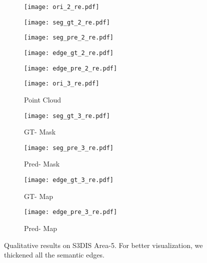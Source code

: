 \documentclass[runningheads]{llncs}
\begin{document}
\begin{figure}
\begin{subfigure}{.193\textwidth}
  \centering
  \texttt{[image: ori\_2\_re.pdf]}
\end{subfigure} \hfil
\begin{subfigure}{.193\textwidth}
  \centering
  \texttt{[image: seg\_gt\_2\_re.pdf]}
\end{subfigure} \hfil
\begin{subfigure}{.193\textwidth}
  \centering
  \texttt{[image: seg\_pre\_2\_re.pdf]}
\end{subfigure} \hfil
\begin{subfigure}{.193\textwidth}
  \centering
  \texttt{[image: edge\_gt\_2\_re.pdf]}
\end{subfigure} \hfil
\begin{subfigure}{.193\textwidth}
  \centering
  \texttt{[image: edge\_pre\_2\_re.pdf]}
\end{subfigure}

\begin{subfigure}{.193\textwidth}
  \centering
  \texttt{[image: ori\_3\_re.pdf]}
  \caption{Point Cloud}
\end{subfigure} \hfil
\begin{subfigure}{.193\textwidth}
  \centering
  \texttt{[image: seg\_gt\_3\_re.pdf]}
  \caption{GT-{\SemSegPoint} Mask}
\end{subfigure} \hfil
\begin{subfigure}{.193\textwidth}
  \centering
  \texttt{[image: seg\_pre\_3\_re.pdf]}
  \caption{Pred-{\SemSegPoint} Mask}
\end{subfigure} \hfil
\begin{subfigure}{.193\textwidth}
  \centering
  \texttt{[image: edge\_gt\_3\_re.pdf]}
  \caption{GT-{\SemEdgePoint} Map}
\end{subfigure} \hfil
\begin{subfigure}{.193\textwidth}
  \centering
  \texttt{[image: edge\_pre\_3\_re.pdf]}
  \caption{Pred-{\SemEdgePoint} Map}
\end{subfigure}

\caption{Qualitative results on S3DIS Area-5. For better visualization, we thickened all the semantic edges.
}
\label{fig:qualitative}
\end{figure}
\end{document}
